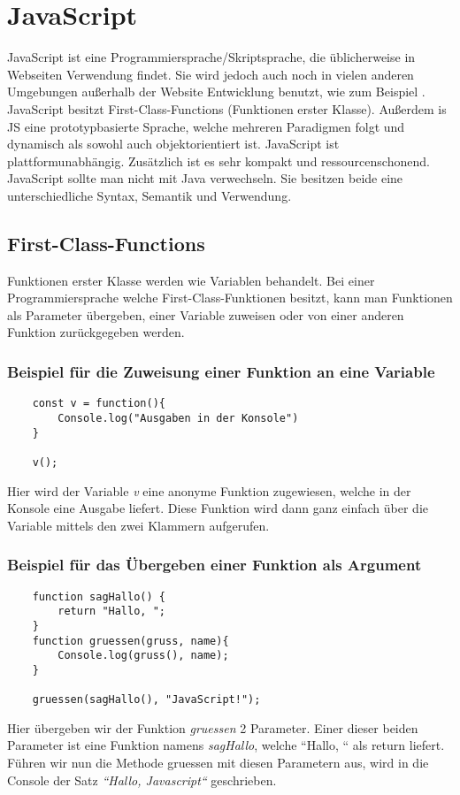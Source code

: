 \section{JavaScript}
\label{js}

JavaScript ist eine Programmiersprache/Skriptsprache, die üblicherweise in Webseiten Verwendung 
findet. Sie wird jedoch auch noch in vielen anderen Umgebungen außerhalb der Website Entwicklung
benutzt, wie zum Beispiel . 
JavaScript besitzt First-Class-Functions (Funktionen erster Klasse). 
Außerdem is JS eine prototypbasierte Sprache, welche mehreren Paradigmen folgt und dynamisch als sowohl auch 
objektorientiert ist. JavaScript ist plattformunabhängig. Zusätzlich ist es sehr kompakt und 
ressourcenschonend. JavaScript sollte man nicht mit Java verwechseln. 
Sie besitzen beide eine unterschiedliche Syntax, Semantik und Verwendung.~\cite{JS}

\subsection{First-Class-Functions}
Funktionen erster Klasse werden wie Variablen behandelt. Bei einer Programmiersprache welche 
First-Class-Funktionen besitzt, kann man Funktionen als Parameter übergeben, einer Variable 
zuweisen oder von einer anderen Funktion zurückgegeben werden.~\cite{First-Class-Funktion}

\subsubsection{Beispiel für die Zuweisung einer Funktion an eine Variable}
\begin{lstlisting}
    const v = function(){
        Console.log("Ausgaben in der Konsole")
    }

    v();
\end{lstlisting}
Hier wird der Variable \textit{v} eine anonyme Funktion zugewiesen, welche in der Konsole 
eine Ausgabe liefert. Diese Funktion wird dann ganz einfach über die Variable mittels den zwei 
Klammern aufgerufen.


\subsubsection{Beispiel für das Übergeben einer Funktion als Argument}
\begin{lstlisting}
    function sagHallo() {
        return "Hallo, ";
    }
    function gruessen(gruss, name){
        Console.log(gruss(), name);
    }

    gruessen(sagHallo(), "JavaScript!");
\end{lstlisting}
Hier übergeben wir der Funktion \textit{gruessen} 2 Parameter. Einer dieser beiden Parameter ist eine
Funktion namens \textit{sagHallo}, welche ``Hallo, `` als return liefert. Führen wir nun 
die Methode gruessen mit diesen Parametern aus, wird in die Console der Satz 
\textit{``Hallo, Javascript``} geschrieben.

